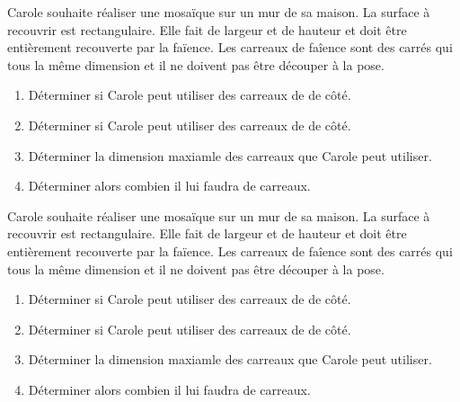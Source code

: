 \begin{exercice*}[Mosaïque]
    Carole souhaite réaliser une mosaïque sur un mur de sa maison. La surface à recouvrir est rectangulaire.
    Elle fait  de largeur et  de hauteur et doit être entièrement recouverte par la faïence.
    Les carreaux de faîence sont des carrés qui tous la même dimension et il ne doivent pas être découper à la pose.    
    \begin{enumerate}
        \item Déterminer si Carole peut utiliser des carreaux de  de côté.
        \item Déterminer si Carole peut utiliser des carreaux de  de côté.
        \item Déterminer la dimension maxiamle des carreaux que Carole peut utiliser.
        \item Déterminer alors combien il lui faudra de carreaux.
    \end{enumerate}
\end{exercice*}
\begin{corrige}
    Carole souhaite réaliser une mosaïque sur un mur de sa maison. La surface à recouvrir est rectangulaire.
    Elle fait  de largeur et  de hauteur et doit être entièrement recouverte par la faïence.
    Les carreaux de faîence sont des carrés qui tous la même dimension et il ne doivent pas être découper à la pose.

    \begin{enumerate}
        \item Déterminer si Carole peut utiliser des carreaux de  de côté.
        \item Déterminer si Carole peut utiliser des carreaux de  de côté.
        \item Déterminer la dimension maxiamle des carreaux que Carole peut utiliser.
        \item Déterminer alors combien il lui faudra de carreaux.
    \end{enumerate}
\end{corrige}

